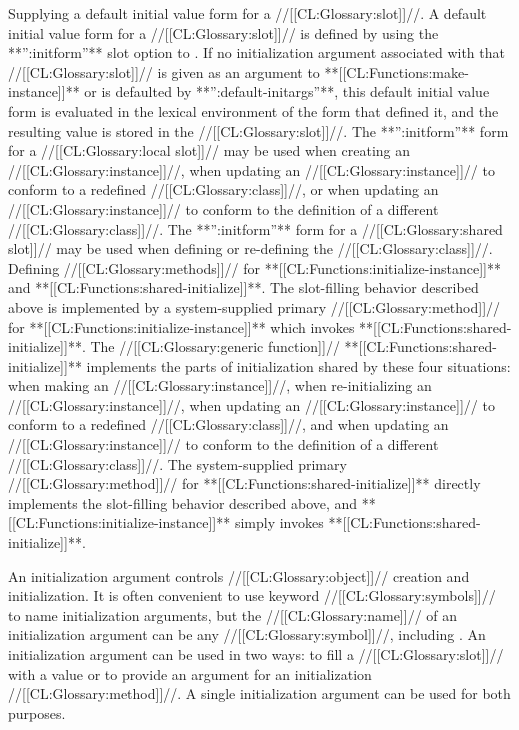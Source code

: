 \itemitem{\bull} Supplying a default initial value form for a //[[CL:Glossary:slot]]//.   A default initial value form for a //[[CL:Glossary:slot]]// is defined by using the  **'':initform''** slot option to .  If no initialization argument associated with that //[[CL:Glossary:slot]]// is given as an argument to  **[[CL:Functions:make-instance]]** or is defaulted by **'':default-initargs''**, this default initial value form is evaluated in the lexical environment of the  form that defined it, and the resulting value is stored in the //[[CL:Glossary:slot]]//.  The **'':initform''** form for a //[[CL:Glossary:local slot]]// may be used when creating an //[[CL:Glossary:instance]]//, when  updating an //[[CL:Glossary:instance]]// to conform to a redefined //[[CL:Glossary:class]]//,  or when updating an //[[CL:Glossary:instance]]// to conform to the definition of a different //[[CL:Glossary:class]]//. The **'':initform''** form for a //[[CL:Glossary:shared slot]]// may be used when defining or re-defining the //[[CL:Glossary:class]]//.
                                                                        \itemitem{\bull}  Defining //[[CL:Glossary:methods]]// for **[[CL:Functions:initialize-instance]]** and **[[CL:Functions:shared-initialize]]**.  The slot-filling behavior described above is implemented by a system-supplied primary //[[CL:Glossary:method]]// for **[[CL:Functions:initialize-instance]]** which invokes **[[CL:Functions:shared-initialize]]**. The //[[CL:Glossary:generic function]]// **[[CL:Functions:shared-initialize]]** implements the parts of initialization shared by these four situations: when making an //[[CL:Glossary:instance]]//,  when re-initializing an //[[CL:Glossary:instance]]//, when updating an //[[CL:Glossary:instance]]// to conform to a redefined //[[CL:Glossary:class]]//, and when updating an //[[CL:Glossary:instance]]//  to conform to the definition of a different //[[CL:Glossary:class]]//. The system-supplied primary //[[CL:Glossary:method]]// for **[[CL:Functions:shared-initialize]]** directly implements the slot-filling behavior described above, and **[[CL:Functions:initialize-instance]]** simply invokes **[[CL:Functions:shared-initialize]]**.

\endlist


An initialization argument controls //[[CL:Glossary:object]]// creation and initialization.  It is often convenient to use keyword //[[CL:Glossary:symbols]]// to name initialization arguments, but the //[[CL:Glossary:name]]// of an initialization argument can be any //[[CL:Glossary:symbol]]//, including \nil.  An initialization argument can be used in two ways: to fill a //[[CL:Glossary:slot]]// with a value or to provide an argument for an initialization //[[CL:Glossary:method]]//.  A single initialization argument can be used for both purposes.

